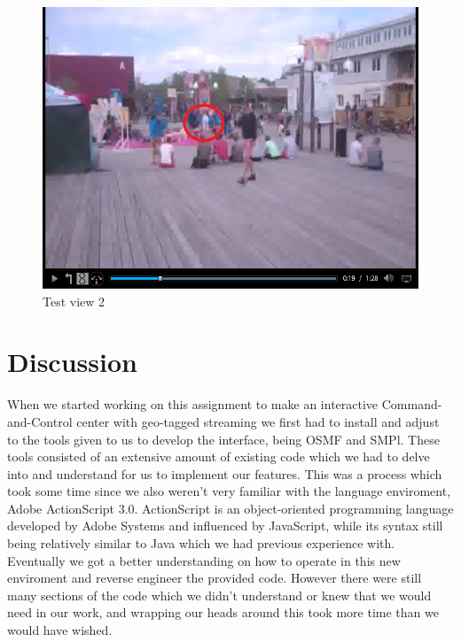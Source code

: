 \documentclass[9pt,a4paper]{acmproc}
\begin{document}
\begin{figure}[ht!]
\begin{center}
	\includegraphics[scale=0.5]{Hoverboard_2.png}
	\caption{Test view 2}
	\label{fig:testview2}
\end{center}
\end{figure}



\section{Discussion}
When we started working on this assignment to make an interactive Command-and-Control center with geo-tagged streaming we first had to install and adjust to the tools given to us to develop the interface, being OSMF and SMPl. These tools consisted of an extensive amount of existing code which we had to delve into and understand for us to implement our features.
This was a process which took some time since we also weren’t very familiar with the language enviroment, Adobe ActionScript 3.0. ActionScript is an object-oriented programming language developed by Adobe Systems and influenced by JavaScript, while its syntax still being relatively similar to Java which we had previous experience with. Eventually we got a better understanding on how to operate in this new enviroment and reverse engineer the provided code. However there were still many sections of the code which we didn’t understand or knew that we would need in our work, and wrapping our heads around this took more time than we would have wished. 
\end{document}
